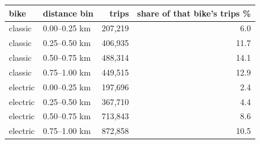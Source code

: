 \begin{tabular}{llrr}
\toprule
\textbf{bike} & \textbf{distance bin} & \textbf{trips} & \textbf{share of that bike's trips \%} \\
\midrule
classic & 0.00--0.25 km & 207,219 & 6.0 \\
classic & 0.25--0.50 km & 406,935 & 11.7 \\
classic & 0.50--0.75 km & 488,314 & 14.1 \\
classic & 0.75--1.00 km & 449,515 & 12.9 \\
electric & 0.00--0.25 km & 197,696 & 2.4 \\
electric & 0.25--0.50 km & 367,710 & 4.4 \\
electric & 0.50--0.75 km & 713,843 & 8.6 \\
electric & 0.75--1.00 km & 872,858 & 10.5 \\
\bottomrule
\end{tabular}
